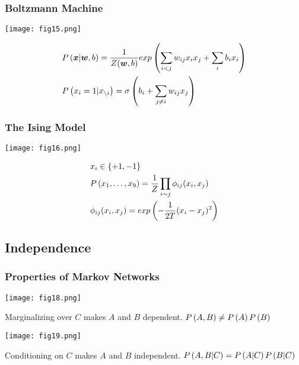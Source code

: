 \subsubsection*{Boltzmann Machine}

\begin{minipage}{0.4\textwidth}
	\centering
	\texttt{[image: fig15.png]}
\end{minipage}
\begin{minipage}{0.6\textwidth}
	\begin{align*}
		&\P{\vec{x}|\vec{w},b}=\frac{1}{Z(\vec{w},b)}\e{\sum_{i<j}w_{ij}x_ix_j+\sum_ib_ix_i} \\
		&\P{x_i=1|x_{\setminus i}}=\si\left(b_i+\sum_{j\neq i}w_{ij}x_j\right)
	\end{align*}
\end{minipage}

\subsubsection*{The Ising Model}

\begin{minipage}{0.4\textwidth}
	\centering
	\texttt{[image: fig16.png]}
\end{minipage}
\begin{minipage}{0.6\textwidth}
	\begin{align*}
		&x_i\in\{+1,-1\} \\
		&\P{x_1,\dotsc,x_9}=\frac{1}{Z}\prod_{i\sim j}\ph_{ij}(x_i,x_j) \\
		&\ph_{ij}(x_i,x_j)=\e{-\frac{1}{2T}(x_i-x_j)^2}
	\end{align*}
\end{minipage}

\subsection{Independence}

\subsubsection*{Properties of Markov Networks}

\begin{minipage}{0.6\textwidth}
	\centering
	\texttt{[image: fig18.png]}
\end{minipage}
\begin{minipage}{0.4\textwidth}
	Marginalizing over $C$ makes $A$ and $B$ dependent. $\P{A,B}\neq\P{A}\P{B}$
\end{minipage}
\begin{minipage}{0.6\textwidth}
	\centering
	\texttt{[image: fig19.png]}
\end{minipage}
\begin{minipage}{0.4\textwidth}
	Conditioning on $C$ makes $A$ and $B$ independent. $\P{A,B|C}=\P{A|C}\P{B|C}$
\end{minipage}

